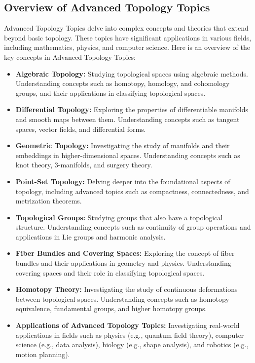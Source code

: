 \documentclass[openany]{book}
\begin{document}
\subsection{Overview of Advanced Topology Topics}
Advanced Topology Topics delve into complex concepts and theories that extend beyond basic topology. These topics have significant applications in various fields, including mathematics, physics, and computer science. Here is an overview of the key concepts in Advanced Topology Topics:
\begin{itemize}
    \item \textbf{Algebraic Topology:} Studying topological spaces using algebraic methods. Understanding concepts such as homotopy, homology, and cohomology groups, and their applications in classifying topological spaces.
    \item \textbf{Differential Topology:} Exploring the properties of differentiable manifolds and smooth maps between them. Understanding concepts such as tangent spaces, vector fields, and differential forms.
    \item \textbf{Geometric Topology:} Investigating the study of manifolds and their embeddings in higher-dimensional spaces. Understanding concepts such as knot theory, 3-manifolds, and surgery theory.
    \item \textbf{Point-Set Topology:} Delving deeper into the foundational aspects of topology, including advanced topics such as compactness, connectedness, and metrization theorems.
    \item \textbf{Topological Groups:} Studying groups that also have a topological structure. Understanding concepts such as continuity of group operations and applications in Lie groups and harmonic analysis.
    \item \textbf{Fiber Bundles and Covering Spaces:} Exploring the concept of fiber bundles and their applications in geometry and physics. Understanding covering spaces and their role in classifying topological spaces.
    \item \textbf{Homotopy Theory:} Investigating the study of continuous deformations between topological spaces. Understanding concepts such as homotopy equivalence, fundamental groups, and higher homotopy groups.
    \item \textbf{Applications of Advanced Topology Topics:} Investigating real-world applications in fields such as physics (e.g., quantum field theory), computer science (e.g., data analysis), biology (e.g., shape analysis), and robotics (e.g., motion planning).

\end{itemize}
\end{document}
